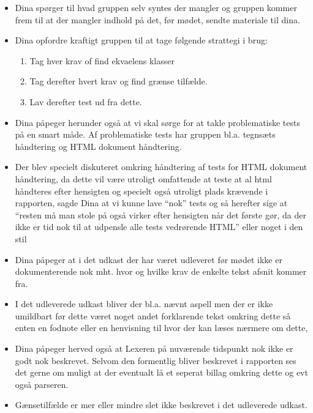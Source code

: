 \documentclass[a4paper,10pt,draft]{article}
\begin{document}
\begin{itemize}

\item Dina spørger til hvad gruppen selv syntes der mangler og gruppen kommer frem til at der mangler indhold på det, før mødet, sendte materiale til dina.

\item Dina opfordre kraftigt gruppen til at tage følgende strattegi i brug:

\begin{enumerate}
\item Tag hver krav of find ekvaelens klasser
\item Tag derefter hvert krav og find grænse tilfælde.
\item Lav derefter test ud fra dette.
\end{enumerate}

\item Dina påpeger herunder også at vi skal sørge for at takle problematiske tests på en smart måde. Af problematiske tests har gruppen bl.a. tegnsæts håndtering og HTML dokument håndtering.

\item Der blev specielt diskuteret omkring håndtering af tests for HTML dokument håndtering, da dette vil være utroligt omfattende at teste at al html håndteres efter hensigten og specielt også utroligt plads krævende i rapporten, sagde Dina at vi kunne lave ``nok'' tests og så herefter sige at ``resten må man stole på også virker efter hensigten når det første gør, da der ikke er tid nok til at udpensle alle tests vedrørende HTML'' eller noget i den stil

\item Dina påpeger at i det udkast der har været udleveret før mødet ikke er dokumenterende nok mht. hvor og hvilke krav de enkelte tekst afsnit kommer fra.

\item I det udleverede udkast bliver der bl.a. nævnt aspell men der er ikke umildbart før dette været noget andet forklarende tekst omkring dette så enten en fodnote eller en henvisning til hvor der kan læses nærmere om dette,

\item Dina påpeger herved også at Lexeren på nuværende tidspunkt nok ikke er godt nok beskrevet. Selvom den formentlig bliver beskrevet i rapporten ses det gerne om muligt at der eventualt lå et seperat billag omkring dette og evt også parseren.

\item Gænsetilfælde er mer eller mindre slet ikke beskrevet i det udleverede udkast.


\end{itemize}
\end{document}

